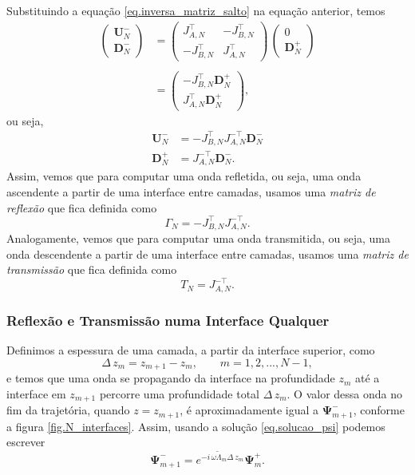 Substituindo a equa\c{c}\~ao \ref{eq.inversa_matriz_salto} na equa\c{c}\~ao anterior, temos
\begin{align*}
\begin{pmatrix}
\mathbf{U}_N^-\\
\mathbf{D}_N^-
\end{pmatrix}
&=
\begin{pmatrix}
J_{A,N}^\top&-J_{B,N}^\top\\
-J_{B,N}^\top&J_{A,N}^\top
\end{pmatrix}
\,
\begin{pmatrix}
0\\
\mathbf{D}_N^+
\end{pmatrix}\\\\
&=
\begin{pmatrix}
-J_{B,N}^\top \mathbf{D}_N^+\\
 J_{A,N}^\top \mathbf{D}_N^+
\end{pmatrix},
\end{align*}
ou seja,
\begin{align*}
\mathbf{U}_N^-&=-J_{B,N}^\top J_{A,N}^{-\top}\mathbf{D}_N^-\\
\mathbf{D}_N^+&=J_{A,N}^{-\top}\mathbf{D}_N^-.
\end{align*}
Assim, vemos que para computar uma onda refletida, ou seja, uma onda ascendente a partir de uma interface entre camadas, usamos uma \textit{matriz de reflex\~ao} que fica definida como
\begin{equation}\label{eq.reflexao_N}
\Gamma_N=-J_{B,N}^\top J_{A,N}^{-\top}.
\end{equation} 
Analogamente, vemos que para computar uma onda transmitida, ou seja, uma onda descendente a partir de uma interface entre camadas, usamos uma \textit{matriz de transmiss\~ao} que fica definida como
\begin{equation}\label{eq.transmissao_N}
T_N=J_{A,N}^{-\top}.
\end{equation} 

\subsubsection{Reflex\~ao e Transmiss\~ao numa Interface Qualquer}
Definimos a espessura de uma camada, a partir da interface superior, como
\begin{equation}
\Delta\,z_m=z_{m+1}-z_m,\qquad m=1,2,...,N-1,
\end{equation}
e temos que uma onda se propagando da interface na profundidade $z_m$ at\'e a interface em $z_{m+1}$ percorre uma profundidade total $\Delta\,z_m$. O valor dessa onda no fim da trajet\'oria, quando $z=z_{m+1}$, \'e aproximadamente igual a $\mathbf{\Psi}^-_{m+1}$, conforme a figura \ref{fig.N_interfaces}. Assim, usando a solu\c{c}\~ao \ref{eq.solucao_psi} podemos escrever
\begin{equation}\label{eq.solucao_delta_zm}
\mathbf{\Psi}^-_{m+1}=e^{-i\,\omega\tilde{\Lambda}_m\Delta\,z_m}\mathbf{\Psi}^+_m.
\end{equation}

